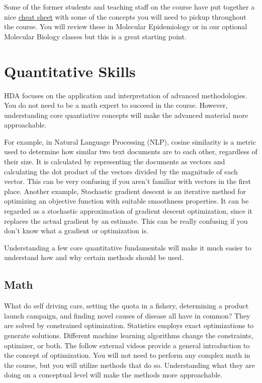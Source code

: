 \documentclass[
]{book}
\begin{document}
Some of the former students and teaching staff on the course have put together a nice \href{Biology\%20for\%20OMICs\%20cheat\%20sheet.docx}{cheat sheet} with some of the concepts you will need to pickup throughout the course. You will review these in Molecular Epidemiology or in our optional Molecular Biology classes but this is a great starting point.

\section{Quantitative Skills}\label{quantitative-skills}

HDA focuses on the application and interpretation of advanced methodologies. You do not need to be a math expert to succeed in the course. However, understanding core quantiative concepts will make the advanced material more approachable.

For example, in Natural Language Processing (NLP), cosine similarity is a metric used to determine how similar two text documents are to each other, regardless of their size. It is calculated by representing the documents as vectors and calculating the dot product of the vectors divided by the magnitude of each vector. This can be very confusing if you aren't familiar with vectors in the first place. Another example, Stochastic gradient descent is an iterative method for optimizing an objective function with suitable smoothness properties. It can be regarded as a stochastic approximation of gradient descent optimization, since it replaces the actual gradient by an estimate. This can be really confusing if you don't know what a gradient or optimization is.

Understanding a few core quantitative fundamentals will make it much easier to understand how and why certain methods should be used.

\subsection{Math}\label{math}

What do self driving cars, setting the quota in a fishery, determining a product launch campaign, and finding novel causes of disease all have in common? They are solved by constrained optimization. Statistics employs exact optimizations to generate solutions. Different machine learning algorithms change the constraints, optimizer, or both. The follow external videos provide a general introduction to the concept of optimization. You will not need to perform any complex math in the course, but you will utilize methods that do so. Understanding what they are doing on a conceptual level will make the methods more approachable.
\end{document}
